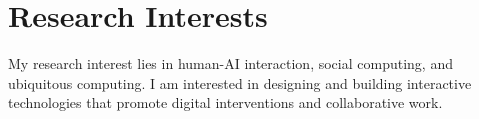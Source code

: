 \section{\textbf{Research Interests}}
\vspace{1mm}
\resumeItemListStart
\item My research interest lies in human-AI interaction, social computing, and ubiquitous computing. I am interested in designing and building interactive technologies that promote digital interventions and collaborative work.
\resumeItemListEnd
\vspace{-3mm}